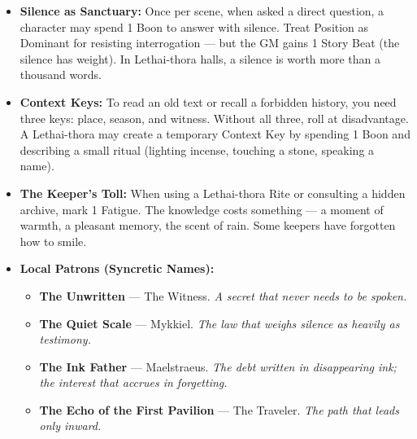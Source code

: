 \begin{itemize}
\item \textbf{Silence as Sanctuary:} Once per scene, when asked a direct question, a character may spend 1 Boon to answer with silence. Treat Position as Dominant for resisting interrogation --- but the GM gains 1 Story Beat (the silence has weight). In Lethai-thora halls, a silence is worth more than a thousand words.
\item \textbf{Context Keys:} To read an old text or recall a forbidden history, you need three keys: place, season, and witness. Without all three, roll at disadvantage. A Lethai-thora may create a temporary Context Key by spending 1 Boon and describing a small ritual (lighting incense, touching a stone, speaking a name).
\item \textbf{The Keeper's Toll:} When using a Lethai-thora Rite or consulting a hidden archive, mark 1 Fatigue. The knowledge costs something --- a moment of warmth, a pleasant memory, the scent of rain. Some keepers have forgotten how to smile.
\item \textbf{Local Patrons (Syncretic Names):}
  \begin{itemize}
    \item \textbf{The Unwritten} --- The Witness. \textit{A secret that never needs to be spoken.}
    \item \textbf{The Quiet Scale} --- Mykkiel. \textit{The law that weighs silence as heavily as testimony.}
    \item \textbf{The Ink Father} --- Maelstraeus. \textit{The debt written in disappearing ink; the interest that accrues in forgetting.}
    \item \textbf{The Echo of the First Pavilion} --- The Traveler. \textit{The path that leads only inward.}
  \end{itemize}
\end{itemize}

